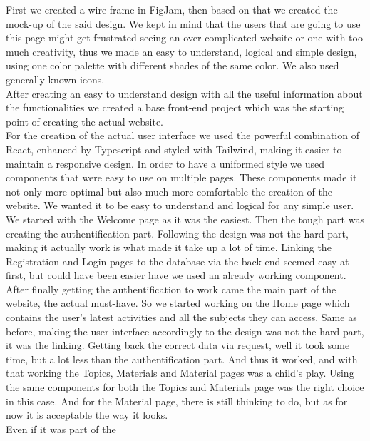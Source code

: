 \documentclass[12pt,a4paper]{article}
\begin{document}
\begin{spacing}{1.5}
    First we created a wire-frame in FigJam, then based on that we created the
    mock-up of the said design. We kept in mind that the users that are going to
    use this page might get frustrated seeing an over complicated website or one
    with too much creativity, thus we made an easy to understand, logical and
    simple design, using one color palette with different shades of the same color.
    We also used generally known icons. \\ \indent After creating an easy to
    understand design with all the useful information about the functionalities we
    created a base front-end project which was the starting point of creating the
    actual website. \\ \indent For the creation of the actual user interface we
    used the powerful combination of React, enhanced by Typescript and styled with
    Tailwind, making it easier to maintain a responsive design. In order to have a
    uniformed style we used components that were easy to use on multiple pages.
    These components made it not only more optimal but also much more comfortable
    the creation of the website. We wanted it to be easy to understand and logical
    for any simple user. \\ \indent We started with the Welcome page as it was the
    easiest. Then the tough part was creating the authentification part. Following
    the design was not the hard part, making it actually work is what made it take
    up a lot of time. Linking the Registration and Login pages to the database via
    the back-end seemed easy at first, but could have been easier have we used an
    already working component. \\ \indent After finally getting the
    authentification to work came the main part of the website, the actual
    must-have. So we started working on the Home page which contains the user's
    latest activities and all the subjects they can access. Same as before, making
    the user interface accordingly to the design was not the hard part, it was the
    linking. Getting back the correct data via request, well it took some time, but
    a lot less than the authentification part. And thus it worked, and with that
    working the Topics, Materials and Material pages was a child's play. Using the
    same components for both the Topics and Materials page was the right choice in
    this case. And for the Material page, there is still thinking to do, but as for
    now it is acceptable the way it looks. \\ \indent Even if it was part of the

\end{spacing}
\end{document}
